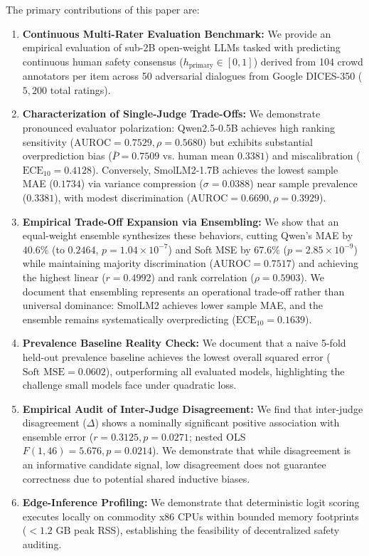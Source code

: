 The primary contributions of this paper are:
\begin{enumerate}
    \item \textbf{Continuous Multi-Rater Evaluation Benchmark:} We provide an empirical evaluation of sub-2B open-weight LLMs tasked with predicting continuous human safety consensus ($h_{\text{primary}} \in [0, 1]$) derived from 104 crowd annotators per item across 50 adversarial dialogues from Google DICES-350 ($5,200$ total ratings).
    \item \textbf{Characterization of Single-Judge Trade-Offs:} We demonstrate pronounced evaluator polarization: Qwen2.5-0.5B achieves high ranking sensitivity ($\text{AUROC} = 0.7529, \rho = 0.5680$) but exhibits substantial overprediction bias ($\bar{P} = 0.7509$ vs. human mean $0.3381$) and miscalibration ($\text{ECE}_{10} = 0.4128$). Conversely, SmolLM2-1.7B achieves the lowest sample MAE ($0.1734$) via variance compression ($\sigma = 0.0388$) near sample prevalence ($0.3381$), with modest discrimination ($\text{AUROC} = 0.6690, \rho = 0.3929$).
    \item \textbf{Empirical Trade-Off Expansion via Ensembling:} We show that an equal-weight ensemble synthesizes these behaviors, cutting Qwen's MAE by $40.6\%$ (to $0.2464$, $p = 1.04 \times 10^{-7}$) and Soft MSE by $67.6\%$ ($p = 2.85 \times 10^{-9}$) while maintaining majority discrimination ($\text{AUROC} = 0.7517$) and achieving the highest linear ($r = \mathbf{0.4992}$) and rank correlation ($\rho = \mathbf{0.5903}$). We document that ensembling represents an operational trade-off rather than universal dominance: SmolLM2 achieves lower sample MAE, and the ensemble remains systematically overpredicting ($\text{ECE}_{10} = 0.1639$).
    \item \textbf{Prevalence Baseline Reality Check:} We document that a naive 5-fold held-out prevalence baseline achieves the lowest overall squared error ($\text{Soft MSE} = 0.0602$), outperforming all evaluated models, highlighting the challenge small models face under quadratic loss.
    \item \textbf{Empirical Audit of Inter-Judge Disagreement:} We find that inter-judge disagreement ($\Delta$) shows a nominally significant positive association with ensemble error ($r = 0.3125, p = 0.0271$; nested OLS $F(1, 46) = 5.676, p = 0.0214$). We demonstrate that while disagreement is an informative candidate signal, low disagreement does not guarantee correctness due to potential shared inductive biases.
    \item \textbf{Edge-Inference Profiling:} We demonstrate that deterministic logit scoring executes locally on commodity x86 CPUs within bounded memory footprints ($<1.2\text{ GB}$ peak RSS), establishing the feasibility of decentralized safety auditing.
\end{enumerate}
